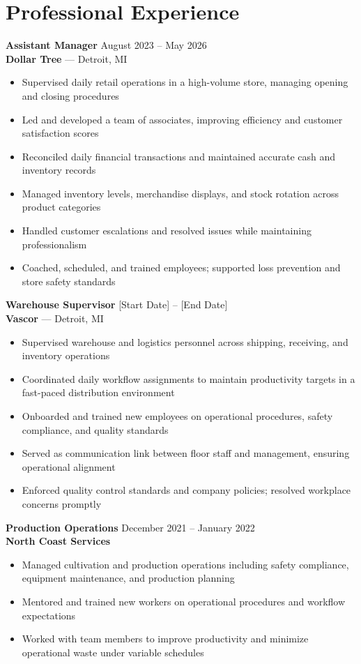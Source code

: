 \documentclass[11pt,letterpaper]{article}
\begin{document}
\section{Professional Experience}

\textbf{Assistant Manager} \hfill August 2023 -- May 2026\\
\textbf{Dollar Tree} --- Detroit, MI
\begin{itemize}
  \item Supervised daily retail operations in a high-volume store, managing opening and closing procedures
  \item Led and developed a team of associates, improving efficiency and customer satisfaction scores
  \item Reconciled daily financial transactions and maintained accurate cash and inventory records
  \item Managed inventory levels, merchandise displays, and stock rotation across product categories
  \item Handled customer escalations and resolved issues while maintaining professionalism
  \item Coached, scheduled, and trained employees; supported loss prevention and store safety standards
\end{itemize}

\bigskip

\textbf{Warehouse Supervisor} \hfill [Start Date] -- [End Date]\\
\textbf{Vascor} --- Detroit, MI
\begin{itemize}
  \item Supervised warehouse and logistics personnel across shipping, receiving, and inventory operations
  \item Coordinated daily workflow assignments to maintain productivity targets in a fast-paced distribution environment
  \item Onboarded and trained new employees on operational procedures, safety compliance, and quality standards
  \item Served as communication link between floor staff and management, ensuring operational alignment
  \item Enforced quality control standards and company policies; resolved workplace concerns promptly
\end{itemize}

\bigskip

\textbf{Production Operations} \hfill December 2021 -- January 2022\\
\textbf{North Coast Services}
\begin{itemize}
  \item Managed cultivation and production operations including safety compliance, equipment maintenance, and production planning
  \item Mentored and trained new workers on operational procedures and workflow expectations
  \item Worked with team members to improve productivity and minimize operational waste under variable schedules
\end{itemize}
\end{document}
